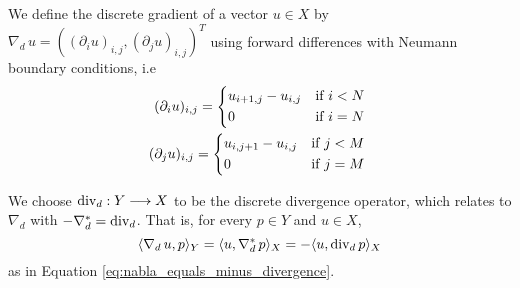     \begin{definition} %
    \label{def:discrete_gradient_operator}

        We define the discrete gradient of a vector $u \in X$ by $\nabla_{d}\,u = ((\partial_{i}u)_{i, j}, (\partial_{j}u)_{i, j})^{T}$ using forward differences with Neumann boundary conditions, i.e
            \begin{eqnarray}
                (\partial_{i}u)_{i, j} =
                    \begin{dcases*}
                        u_{i+1, j} - u_{i, j} & \textnormal{if $i < N$}\\
                        0 & \textnormal{if $i = N$}
                    \end{dcases*}
                \label{eq:forward_partial_i} \\
                (\partial_{j}u)_{i, j} =
                    \begin{dcases*}
                        u_{i, j+1} - u_{i, j} & \textnormal{if $j < M$}\\
                        0 & \textnormal{if $j = M$}
                    \end{dcases*}
                \label{eq:forward_partial_j}
            \end{eqnarray}

    \end{definition}

    We choose $\textnormal{div}_{d}: Y \longrightarrow X$ to be the discrete divergence operator, which relates to $\nabla_{d}$ with $- \nabla_{d}^{\ast} = \textnormal{div}_{d}$. That is, for every $p \in Y$ and $u \in X$,
        $$
            \langle \nabla_{d}\, u, p \rangle_{Y} = \langle u, \nabla_{d}^{\ast}\, p \rangle_{X} = - \langle u, \textnormal{div}_{d}\,p \rangle_{X}
        $$
    as in Equation \ref{eq:nabla_equals_minus_divergence}.

